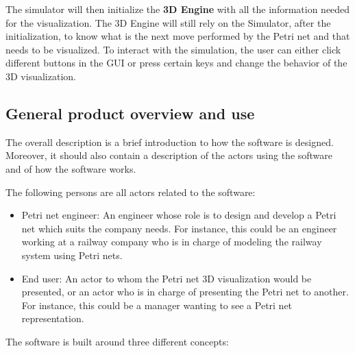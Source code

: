 The simulator will then initialize the \textbf{3D Engine} with all the information needed for the visualization. The 3D Engine will still rely on the Simulator, after the initialization, to know what is the next move performed by the Petri net and that needs to be visualized. \newline
To interact with the simulation, the user can either click different buttons in the GUI or press certain keys and change the behavior of the 3D visualization.

\subsection{General product overview and use}
The overall description is a brief introduction to how the software is designed. Moreover, it should also contain a description of the actors using the software and of how the software works. \newline

The following persons are all actors related to the software:

\begin{itemize}
  \item Petri net engineer: An engineer whose role is to design and develop a Petri net which suits the company needs. \newline
  For instance, this could be an engineer working at a railway company who is in charge of modeling the railway system using Petri nets.
  \item End user: An actor to whom the Petri net 3D visualization would be presented, or an actor who is in charge of presenting the Petri net to another. \newline
  For instance, this could be a manager wanting to see a Petri net representation. 
\end{itemize}

The software is built around three different concepts: 

